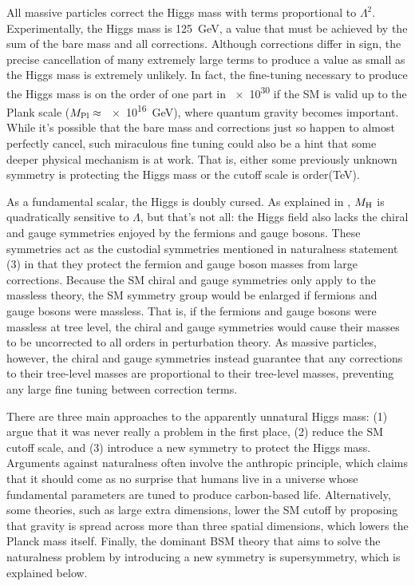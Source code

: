 \documentclass[12pt]{article}
\begin{document}
    All massive particles correct the Higgs mass with terms proportional to $\Lambda^2$. Experimentally, the Higgs mass is \SI{125}{\giga\electronvolt}, a value that must be achieved by the sum of the bare mass and all corrections. Although corrections differ in sign, the precise cancellation of many extremely large terms to produce a value as small as the Higgs mass is extremely unlikely. In fact, the fine-tuning necessary to produce the Higgs mass is on the order of one part in \num{e30} if the SM is valid up to the Plank scale ($M_{\mathrm{Pl}}\approx$ \SI{e16}{\giga\electronvolt}), where quantum gravity becomes important. While it's possible that the bare mass and corrections just so happen to almost perfectly cancel, such miraculous fine tuning could also be a hint that some deeper physical mechanism is at work. That is, either some previously unknown symmetry is protecting the Higgs mass or the cutoff scale is order(TeV).
    
    As a fundamental scalar, the Higgs is doubly cursed. As explained in , $M_{\mathrm{H}}$ is quadratically sensitive to $\Lambda$, but that's not all: the Higgs field also lacks the chiral and gauge symmetries enjoyed by the fermions and gauge bosons. These symmetries act as the custodial symmetries mentioned in naturalness statement (3) in that they protect the fermion and gauge boson masses from large corrections. Because the SM chiral and gauge symmetries only apply to the massless theory, the SM symmetry group would be enlarged if fermions and gauge bosons were massless. That is, if the fermions and gauge bosons were massless at tree level, the chiral and gauge symmetries would cause their masses to be uncorrected to all orders in perturbation theory. As massive particles, however, the chiral and gauge symmetries instead guarantee that any corrections to their tree-level masses are proportional to their tree-level masses, preventing any large fine tuning between correction terms. 

     There are three main approaches to the apparently unnatural Higgs mass: (1) argue that it was never really a problem in the first place, (2) reduce the SM cutoff scale, and (3) introduce a new symmetry to protect the Higgs mass. Arguments against naturalness often involve the anthropic principle, which claims that it should come as no surprise that humans live in a universe whose fundamental parameters are tuned to produce carbon-based life. Alternatively, some theories, such as large extra dimensions, lower the SM cutoff by proposing that gravity is spread across more than three spatial dimensions, which lowers the Planck mass itself. Finally, the dominant BSM theory that aims to solve the naturalness problem by introducing a new symmetry is supersymmetry, which is explained below.
    
\end{document}
